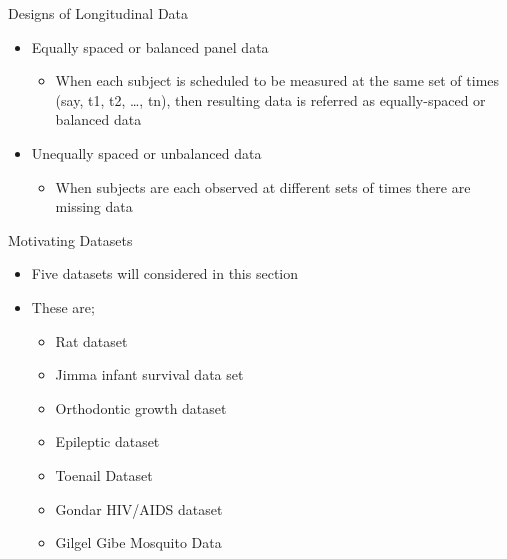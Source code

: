 \documentclass{beamer}
\begin{document}
\begin{frame}{Designs of Longitudinal Data}
\begin{itemize}
\item Equally spaced or balanced panel data \vspace{0.25cm}
\begin{itemize}
	\item When each subject is scheduled to be measured at the same set of times (say, t1, t2, …, tn), then resulting data is referred as equally-spaced or balanced data \vspace{0.25cm}
\end{itemize}
\item Unequally spaced or unbalanced data \vspace{0.25cm}
\begin{itemize}
	\item When subjects are each observed at different sets of times 
	there are missing data
\end{itemize}
\end{itemize}
\end{frame}

\begin{frame}{Motivating Datasets}
\begin{itemize}
	\item Five datasets will considered in this section \vspace{0.25cm}
	\item These are; \vspace{0.25cm}
	\begin{itemize}
		\item Rat dataset
		\item Jimma infant survival data set \vspace{0.25cm}
		\item Orthodontic growth dataset \vspace{0.25cm}
		\item Epileptic dataset \vspace{0.25cm}
		\item Toenail Dataset \vspace{0.25cm}
		\item Gondar HIV/AIDS dataset \vspace{0.25cm}
		\item Gilgel Gibe Mosquito Data
	\end{itemize}
\end{itemize}
\end{frame}
\end{document}
